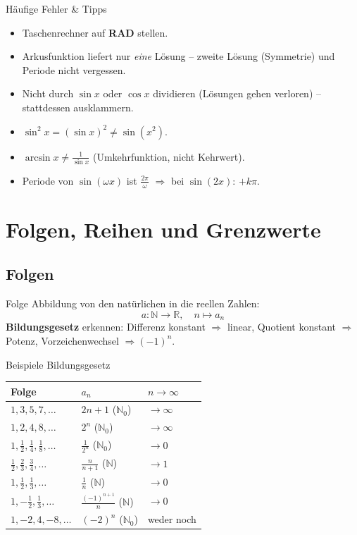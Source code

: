 \documentclass[a4paper, fontsize=7pt]{scrartcl}
\def\N{\mathbb{N}}  %
\def\R{\mathbb{R}}  %
\renewcommand*{\arraystretch}{1.5}  %
\begin{document}
\begin{subbox}{Häufige Fehler \& Tipps}
\begin{itemize}
    \item Taschenrechner auf \textbf{RAD} stellen.
    \item Arkusfunktion liefert nur \emph{eine} Lösung -- zweite Lösung
          (Symmetrie) und Periode nicht vergessen.
    \item Nicht durch $\sin x$ oder $\cos x$ dividieren (Lösungen gehen verloren)
          -- stattdessen ausklammern.
    \item $\sin^2 x = (\sin x)^2 \neq \sin(x^2)$.
    \item $\arcsin x \neq \frac{1}{\sin x}$ (Umkehrfunktion, nicht Kehrwert).
    \item Periode von $\sin(\omega x)$ ist $\frac{2\pi}{\omega}$ $\Rightarrow$
          bei $\sin(2x)$: $+k\pi$.
\end{itemize}
\end{subbox}

\section{Folgen, Reihen und Grenzwerte}

\subsection{Folgen}

\begin{mainbox}{Folge}
Abbildung von den natürlichen in die reellen Zahlen:
$$a\colon \N \to \R, \quad n \mapsto a_n$$
\textbf{Bildungsgesetz} erkennen: Differenz konstant $\Rightarrow$ linear,
Quotient konstant $\Rightarrow$ Potenz, Vorzeichenwechsel $\Rightarrow
(-1)^n$.
\end{mainbox}

\begin{subbox}{Beispiele Bildungsgesetz}
\renewcommand*{\arraystretch}{1.4}
\setlength{\tabcolsep}{2pt}
\begin{tabular}{l|l|l}
Folge & $a_n$ & $n\to\infty$ \\
\hline
$1, 3, 5, 7, \ldots$ & $2n+1$ ($\N_0$) & $\to \infty$ \\
$1, 2, 4, 8, \ldots$ & $2^n$ ($\N_0$) & $\to \infty$ \\
$1, \frac12, \frac14, \frac18, \ldots$ & $\frac{1}{2^n}$ ($\N_0$) & $\to 0$ \\
$\frac12, \frac23, \frac34, \ldots$ & $\frac{n}{n+1}$ ($\N$) & $\to 1$ \\
$1, \frac12, \frac13, \ldots$ & $\frac1n$ ($\N$) & $\to 0$ \\
$1, -\frac12, \frac13, \ldots$ & $\frac{(-1)^{n+1}}{n}$ ($\N$) & $\to 0$ \\
$1, -2, 4, -8, \ldots$ & $(-2)^n$ ($\N_0$) & weder noch \\
\end{tabular}
\end{subbox}
\end{document}
